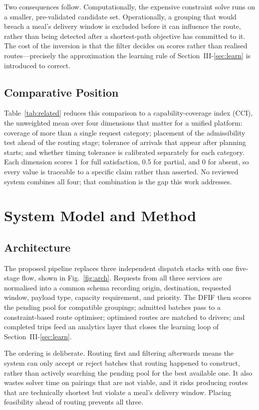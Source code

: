 \documentclass[conference]{IEEEtran}
\begin{document}
Two consequences follow. Computationally, the expensive constraint solve
runs on a smaller, pre-validated candidate set. Operationally, a grouping
that would breach a meal's delivery window is excluded before it can
influence the route, rather than being detected after a shortest-path
objective has committed to it. The cost of the inversion is that the filter
decides on scores rather than realised routes---precisely the approximation
the learning rule of Section~III-\ref{sec:learn} is introduced to correct.

\subsection{Comparative Position}
Table~\ref{tab:related} reduces this comparison to a capability-coverage
index (CCI), the unweighted mean over four dimensions that matter for a
unified platform: coverage of more than a single request category; placement
of the admissibility test ahead of the routing stage; tolerance of arrivals
that appear after planning starts; and whether timing tolerance is calibrated
separately for each category. Each dimension scores 1 for full
satisfaction, 0.5 for partial, and 0 for absent, so every value is traceable
to a specific claim rather than asserted. No reviewed system combines all
four; that combination is the gap this work addresses.

\section{System Model and Method}
\label{sec:model}

\subsection{Architecture}
The proposed pipeline replaces three independent dispatch stacks with one
five-stage flow, shown in Fig.~\ref{fig:arch}. Requests from all three
services are normalised into a common schema recording origin, destination,
requested window, payload type, capacity requirement, and priority. The DFIF
then scores the pending pool for compatible groupings; admitted batches pass
to a constraint-based route optimiser; optimised routes are matched to
drivers; and completed trips feed an analytics layer that closes the learning
loop of Section~III-\ref{sec:learn}.

The ordering is deliberate. Routing first and filtering afterwards means the
system can only accept or reject batches that routing happened to construct,
rather than actively searching the pending pool for the best available one.
It also wastes solver time on pairings that are not viable, and it risks
producing routes that are technically shortest but violate a meal's delivery
window. Placing feasibility ahead of routing prevents all three.
\end{document}
